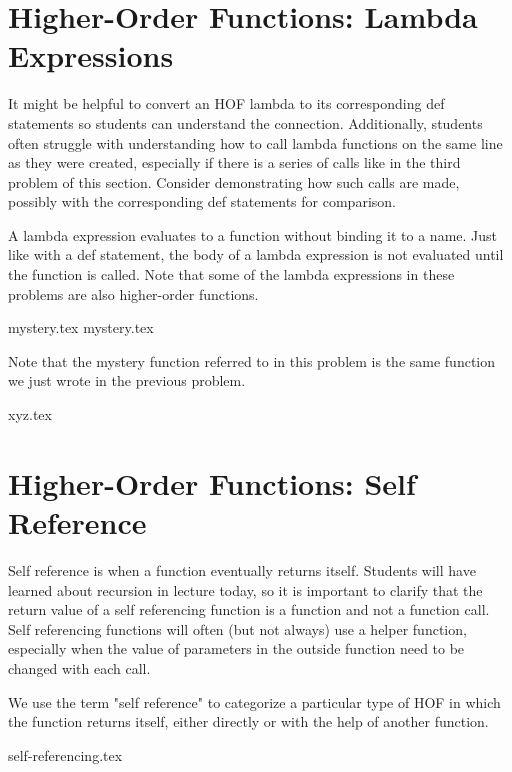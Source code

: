 \documentclass{exam}
\begin{document}
\newpage
\section{Higher-Order Functions: Lambda Expressions}
\begin{guide}
It might be helpful to convert an HOF lambda to its corresponding def statements so students 
can understand the connection. Additionally, students often struggle with understanding how to call lambda functions on the same 
line as they were created, especially if there is a series of calls like in the third problem of this section. Consider 
demonstrating how such calls are made, possibly with the corresponding def statements for comparison.
\newline
\end{guide}
A lambda expression evaluates to a function without binding it to a name. Just like with a def statement, the body 
of a lambda expression is not evaluated until the function is called. Note that some of the lambda expressions in these problems 
are also higher-order functions.

\begin{questions}
{mystery.tex}
{mystery.tex}

\begin{guide}
Note that the mystery function referred to in this problem is the same function we just wrote in the previous problem.
\end{guide}
\newpage
{xyz.tex}
\end{questions}


\newpage
\section{Higher-Order Functions: Self Reference}
\begin{guide}
Self reference is when a function eventually returns itself. Students will have learned about recursion 
in lecture today, so it is important to clarify that the return value of a self referencing function is a function and not 
a function call. Self referencing functions will often (but not always) use a helper function, especially when the value 
of parameters in the outside function need to be changed with each call.
\newline
\end{guide}
We use the term "self reference" to categorize a particular type of HOF in which the function returns itself, 
either directly or with the help of another function.

\begin{questions}
{self-referencing.tex}
\end{questions}

\clearpage
\end{document}
